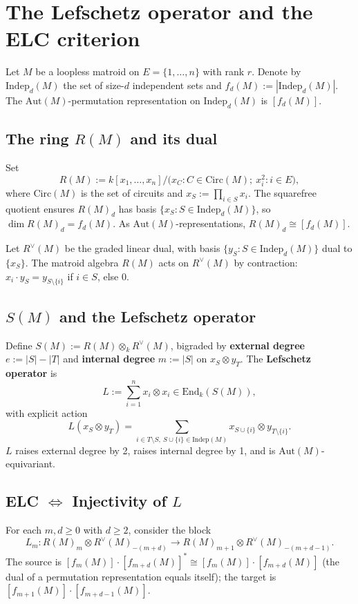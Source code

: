 \documentclass[11pt]{article}
\theoremstyle{definition}
\newcommand{\Indep}{\mathrm{Indep}}
\newcommand{\Circ}{\mathrm{Circ}}
\newcommand{\Aut}{\mathrm{Aut}}
\newcommand{\dualR}{R^{\vee}}
\begin{document}
\section{The Lefschetz operator and the ELC criterion}

Let $M$ be a loopless matroid on $E = \{1, \dots, n\}$ with rank $r$. Denote by $\Indep_d(M)$ the set of size-$d$ independent sets and $f_d(M) := |\Indep_d(M)|$. The $\Aut(M)$-permutation representation on $\Indep_d(M)$ is $[f_d(M)]$.

\subsection{The ring $R(M)$ and its dual}

Set
\[ R(M) := k[x_1, \dots, x_n] \big/ \big(x_C : C \in \Circ(M);\ x_i^2 : i \in E\big), \]
where $\Circ(M)$ is the set of circuits and $x_S := \prod_{i \in S} x_i$. The squarefree quotient ensures $R(M)_d$ has basis $\{x_S : S \in \Indep_d(M)\}$, so $\dim R(M)_d = f_d(M)$. As $\Aut(M)$-representations, $R(M)_d \cong [f_d(M)]$.

Let $\dualR(M)$ be the graded linear dual, with basis $\{y_S : S \in \Indep_d(M)\}$ dual to $\{x_S\}$. The matroid algebra $R(M)$ acts on $\dualR(M)$ by contraction: $x_i \cdot y_S = y_{S \setminus \{i\}}$ if $i \in S$, else $0$.

\subsection{$S(M)$ and the Lefschetz operator}

Define $S(M) := R(M) \otimes_k \dualR(M)$, bigraded by \textbf{external degree} $e := |S| - |T|$ and \textbf{internal degree} $m := |S|$ on $x_S \otimes y_T$. The \textbf{Lefschetz operator} is
\[ L := \sum_{i=1}^n x_i \otimes x_i \in \mathrm{End}_k(S(M)), \]
with explicit action
\[ L(x_S \otimes y_T) = \sum_{i \in T \setminus S,\ S \cup \{i\} \in \Indep(M)} x_{S \cup \{i\}} \otimes y_{T \setminus \{i\}}. \]
$L$ raises external degree by 2, raises internal degree by 1, and is $\Aut(M)$-equivariant.

\subsection{ELC $\iff$ Injectivity of $L$}

For each $m, d \geq 0$ with $d \geq 2$, consider the block
\[ L_m : R(M)_m \otimes \dualR(M)_{-(m+d)} \to R(M)_{m+1} \otimes \dualR(M)_{-(m+d-1)}. \]
The source is $[f_m(M)] \cdot [f_{m+d}(M)]^* \cong [f_m(M)] \cdot [f_{m+d}(M)]$ (the dual of a permutation representation equals itself); the target is $[f_{m+1}(M)] \cdot [f_{m+d-1}(M)]$.
\end{document}
